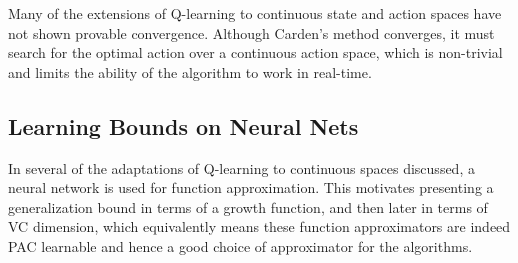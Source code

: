 \documentclass{article} %
\begin{document}
Many of the extensions of Q-learning to continuous state and action spaces have not shown provable convergence.  Although Carden's method converges, it must search for the optimal action over a continuous action space, which is non-trivial and limits the ability of the algorithm to work in real-time.

\subsection{Learning Bounds on Neural Nets}
 In several of the adaptations of Q-learning to continuous spaces discussed, a neural network is used for function approximation.  This motivates presenting a generalization bound in terms of a growth function, and then later in terms of VC dimension, which equivalently means these function approximators are indeed PAC learnable and hence a good choice of approximator for the algorithms.
 
\end{document}
